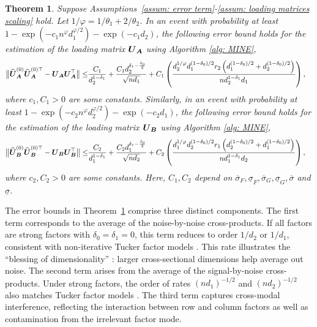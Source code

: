 \documentclass[11pt,letterpaper]{article}
\newtheorem{theorem}{Theorem}[section]
\theoremstyle{definition}
\begin{document}
\begin{theorem}
\label{thm: initialization}
Suppose Assumptions~\ref{assum: error term}-\ref{assum: loading matrices scaling} hold. Let $1/\varphi = 1/\theta_1 + 2/\theta_2$. In an event with probability at least $1- \exp(-c_1n^{\varphi}d_1^{\varphi/2}) - \exp(-c_1d_2)$, the following error bound holds for the estimation of the loading matrix $\boldsymbol{U}_{\boldsymbol{A}}$ using Algorithm \ref{alg: MINE},
\begin{align}
\label{eqn: initial error bound UA}
\big\| \widehat{\boldsymbol{U}}_{\boldsymbol{A}}^{(0)} \widehat{\boldsymbol{U}}_{\boldsymbol{A}}^{(0)\top} - \boldsymbol{U}_{\boldsymbol{A}} \boldsymbol{U}_{\boldsymbol{A}}^\top \big\| 
\le & \frac{C_1}{d_2^{1-\delta_1}} + 
\frac{C_1 d_2^{\delta_1-\frac{\delta_{0}}{2}}}{\sqrt{nd_1}} + C_1  \left(\frac{d_2^{1/\varphi}d_1^{(1-\delta_0)/2}r_2 \left(d_1^{(1-\delta_0)/2} + d_2^{(1-\delta_0)/2}\right)}{nd_2^{1-\delta_1}d_1}\right),
\end{align}
where $c_1,C_1>0$ are some constants. Similarly, in an event with probability at least $1- \exp(-c_2n^{\varphi}d_2^{\varphi/2})-\exp(- c_2d_1)$, the following error bound holds for the estimation of the loading matrix $\boldsymbol{U}_{\boldsymbol{B}}$ using Algorithm \ref{alg: MINE},
\begin{align}
\label{eqn: initial error bound UB}
\big\| \widehat{\boldsymbol{U}}_{\boldsymbol{B}}^{(0)} \widehat{\boldsymbol{U}}_{\boldsymbol{B}}^{(0)\top} -  \boldsymbol{U}_{\boldsymbol{B}} \boldsymbol{U}_{\boldsymbol{B}}^\top \big\| \le & \frac{C_2}{d_1^{1-\delta_1}} + 
\frac{C_2 d_1^{\delta_1-\frac{\delta_{0}}{2}}}{\sqrt{nd_2}} + C_2 \left(\frac{d_1^{1/\varphi}d_2^{(1-\delta_0)/2}r_1 \left(d_2^{(1-\delta_0)/2} + d_1^{(1-\delta_0)/2}\right)}{nd_1^{1-\delta_1}d_2}\right),  
\end{align}
where $c_2,C_2>0$ are some constants.
Here, $C_1, C_2 $ depend on $\overline{\sigma}_{F}, \underline{\sigma}_{ F}, \overline{\sigma}_{G}, \underline{\sigma}_{G}, \overline{\sigma}$ and $\underline{\sigma}$.

\end{theorem}


The error bounds in Theorem~\ref{thm: initialization} comprise three distinct components. The first term corresponds to the average of the noise-by-noise cross-products. If all factors are strong factors with $\delta_0=\delta_1=0$, this term reduces to order $1/d_2$ or $1/d_1$, consistent with non-iterative Tucker factor models \citep{chen2023statistical}. This rate illustrates the ``blessing of dimensionality'' \citep{barigozzi2023quasi}: larger cross-sectional dimensions help average out noise. The second term arises from the average of the signal-by-noise cross-products. Under strong factors, the order of rates $(nd_1)^{-1/2}$ and $(nd_2)^{-1/2}$ also matches Tucker factor models \citep{han2024tensor}. The third term captures cross-modal interference, reflecting the interaction between row and column factors as well as contamination from the irrelevant factor mode.
\end{document}
